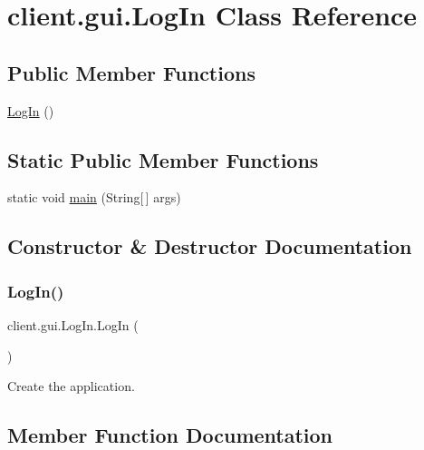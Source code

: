 \hypertarget{classclient_1_1gui_1_1_log_in}{}\section{client.\+gui.\+Log\+In Class Reference}
\label{classclient_1_1gui_1_1_log_in}
\subsection*{Public Member Functions}
\begin{DoxyCompactItemize}
\item 
\hyperlink{classclient_1_1gui_1_1_log_in_a035e2ad40bb6d0fdc8041cc895a6b959}{Log\+In} ()
\end{DoxyCompactItemize}
\subsection*{Static Public Member Functions}
\begin{DoxyCompactItemize}
\item 
static void \hyperlink{classclient_1_1gui_1_1_log_in_a5bff6d5c81be59bf4aecb55182417f8a}{main} (String\mbox{[}$\,$\mbox{]} args)
\end{DoxyCompactItemize}


\subsection{Constructor \& Destructor Documentation}
\mbox{\label{classclient_1_1gui_1_1_log_in_a035e2ad40bb6d0fdc8041cc895a6b959}} 
\subsubsection{\texorpdfstring{Log\+In()}{LogIn()}}
{\footnotesize\ttfamily client.\+gui.\+Log\+In.\+Log\+In (\begin{DoxyParamCaption}{ }\end{DoxyParamCaption})}

Create the application. 

\subsection{Member Function Documentation}
\mbox{\label{classclient_1_1gui_1_1_log_in_a5bff6d5c81be59bf4aecb55182417f8a}} 
